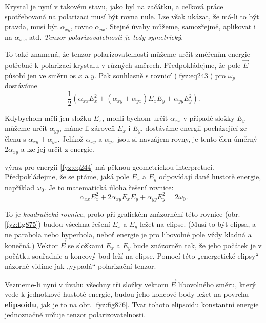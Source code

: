     Krystal je nyní v takovém stavu, jako byl na začátku, a celková práce spotřebovaná na polarizaci
    musí být rovna nule. Lze však ukázat, že má-li to být pravda, musí být \(\alpha_{xy}\), rovno
    \(\alpha_{yx}\). Stejné úvahy můžeme, samozřejmě, aplikovat i na \(\alpha_{xz}\), atd.
    \emph{Tenzor polarizovatelnosti je tedy symetrický}.

    To také znamená, že tenzor polarizovatelnosti můžeme určit změřením energie potřebné k
    polarizaci krystalu v různých směrech. Předpokládejme, že pole \(\vec{E}\) působí jen ve směru
    os \(x\) a \(y\). Pak souhlasně s rovnicí (\ref{fyz:eq243}) pro \(\omega_p\) dostáváme
    \begin{equation}\label{fyz:eq244}
      \frac{1}{2}\left(\alpha_{xx}E_x^2 + (\alpha_{xy} + \alpha_{yx})E_xE_y + \alpha_{yy}E_y^2\right).
    \end{equation}

    Kdybychom měli jen složku \(E_x\), mohli bychom určit \(\alpha_{xx}\) v případě složky \(E_y\)
    můžeme určit \(\alpha_{yy}\), máme-li zároveň \(E_x\) i \(E_y\), dostáváme energii pocházející
    ze členu s \(\alpha_{xy} + \alpha_{yx}\). Jelikož \(\alpha_{xy}\) a \(\alpha_{yx}\) jsou si
    navzájem rovny, je tento člen úměrný \(2\alpha_{xy}\) a lze jej určit z energie.

    výraz pro energii \eqref{fyz:eq244} má pěknou geometrickou interpretaci. Předpokládejme, že se
    ptáme, jaká pole \(E_x\) a \(E_y\) odpovídají dané hustotě energie, například \(\omega_0\). Je
    to matematická úloha řešení rovnice:
    \begin{equation*}
      \alpha_{xx}E_x^2 + 2\alpha_{xy}E_xE_y + \alpha_{yy}E_y^2 = 2\omega_0.
    \end{equation*}

    To je \emph{kvadratická rovnice}, proto při grafickém znázornění této rovnice (obr.
    \ref{fyz:fig875}) budou všechna řešení \(E_x\) a \(E_y\) ležet na elipse. (Musí to být elipsa, a
    ne parabola nebo hyperbola, neboť energie je pro libovolné pole vždy kladná a konečná.) Vektor
    \(\vec{E}\) se složkami \(E_x\) a \(E_y\) bude znázorněn tak, že jeho počátek je v počátku
    souřadnic a koncový bod leží na elipse. Pomocí této „energetické elipsy“ názorně vidíme jak
    „vypadá“ polarizační tenzor.

    
    Vezmeme-li nyní v úvahu všechny tři složky vektoru \(\vec{E}\) libovolného směru, který vede k
    jednotkové hustotě energie, budou jeho koncové body ležet na povrchu \textbf{elipsoidu}, jak je
    to na obr. \ref{fyz:fig876}. Tvar tohoto elipsoidu konstantní energie jednoznačně určuje tenzor
    polarizovatelnosti.

